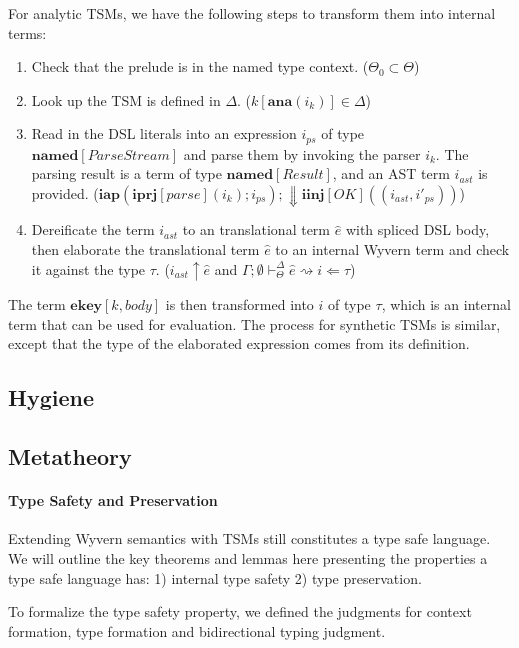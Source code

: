 \documentclass{sig-alternate}
\newcommand{\myvdash}{\vdash_{\Theta}^{\Delta}}
\begin{document}
For analytic TSMs, we have the following steps to transform them into internal terms:
\begin{enumerate}\setlength{\itemsep}{0pt}
\item Check that the prelude is in the named type context. ($\Theta_0\subset\Theta$)
\item Look up the TSM is defined in $\Delta$. ($k[\mathbf{ana}(i_k)]\in\Delta$)
\item Read in the DSL literals into an expression $i_{ps}$ of type $\mathbf{named}[ParseStream]$ and parse them by invoking the parser $i_k$. The parsing result is a term of type $\mathbf{named}[Result]$, and an AST term $i_{ast}$ is provided. ($\mathbf{iap}(\mathbf{iprj}[parse](i_k); i_{ps});\Downarrow \mathbf{iinj}[OK]((i_{ast}, i'_{ps}))$)
\item Dereificate the term $i_{ast}$ to an translational term $\hat{e}$ with spliced DSL body, then elaborate the translational term $\hat{e}$ to an internal Wyvern term and check it against the type $\tau$. ($i_{ast}\uparrow \hat{e}$ and $\Gamma;\emptyset\myvdash \hat{e} \rightsquigarrow i \Leftarrow \tau$)
\end{enumerate}
The term $\mathbf{ekey}[k,body]$ is then transformed into $i$ of type $\tau$, which is an internal term that can be used for evaluation. The process for synthetic TSMs is similar, except that the type of the elaborated expression comes from its definition. 


\subsection{Hygiene}

\subsection{Metatheory}
\paragraph{Type Safety and Preservation}
Extending Wyvern semantics with TSMs still constitutes a type safe language. We will outline the key theorems and lemmas here presenting the properties a type safe language has: 1) internal type safety 2) type preservation. 

To formalize the type safety property, we defined the judgments for context formation, type formation and bidirectional typing judgment. 
\end{document}
